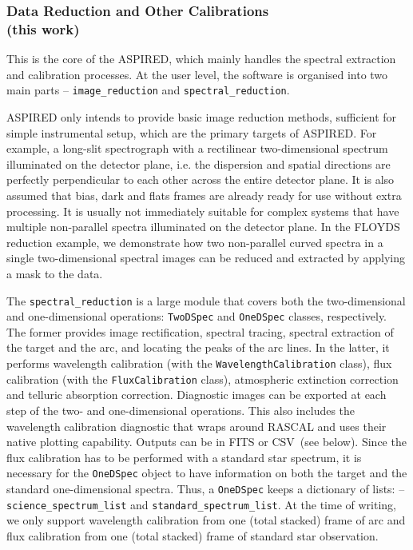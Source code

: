 \documentclass[linenumbers, twocolumn]{aastex631}
\begin{document}
\subsubsection*{Data Reduction and Other Calibrations\\(this work)}
This is the core of the \textsc{ASPIRED}, which mainly handles the spectral
extraction and calibration processes. At the user level, the software is
organised into two main parts -- \texttt{image\_reduction} and
\texttt{spectral\_reduction}.

\textsc{ASPIRED} only intends to provide basic image reduction methods,
sufficient for simple instrumental setup, which are the primary targets of
\textsc{ASPIRED}. For example, a long-slit spectrograph with a rectilinear
two-dimensional spectrum illuminated on the detector plane, i.e. the dispersion
and spatial directions are perfectly perpendicular to each other across the
entire detector plane. It is also assumed that bias, dark and flats frames
are already ready for use without extra processing. It is usually not
immediately suitable for complex systems that have multiple non-parallel
spectra illuminated on the detector plane. In the FLOYDS reduction example,
we demonstrate how two non-parallel curved spectra in a single two-dimensional
spectral images can be reduced and extracted by applying a mask to the data.

The \texttt{spectral\_reduction} is a large module that covers both the
two-dimensional and one-dimensional operations: \texttt{TwoDSpec} and
\texttt{OneDSpec} classes, respectively. The former provides image
rectification, spectral tracing, spectral extraction of the target and the
arc, and locating the peaks of the arc lines. In the latter, it performs
wavelength calibration (with the \texttt{WavelengthCalibration} class),
flux calibration (with the \texttt{FluxCalibration} class), atmospheric
extinction correction and telluric absorption correction. Diagnostic images
can be exported at each step of the two- and one-dimensional operations.
This also includes the wavelength calibration diagnostic that wraps around
\textsc{RASCAL} and uses their native plotting capability. Outputs can be
in FITS or CSV~(see below). Since the flux calibration has to be performed
with a standard star spectrum, it is necessary for the \texttt{OneDSpec}
object to have information on both the target and the standard one-dimensional
spectra. Thus, a \texttt{OneDSpec} keeps a dictionary of lists: --
\texttt{science\_spectrum\_list} and \texttt{standard\_spectrum\_list}. At the
time of writing, we only support wavelength calibration from one (total
stacked) frame of arc and flux calibration from one (total stacked) frame
of standard star observation.
\end{document}
